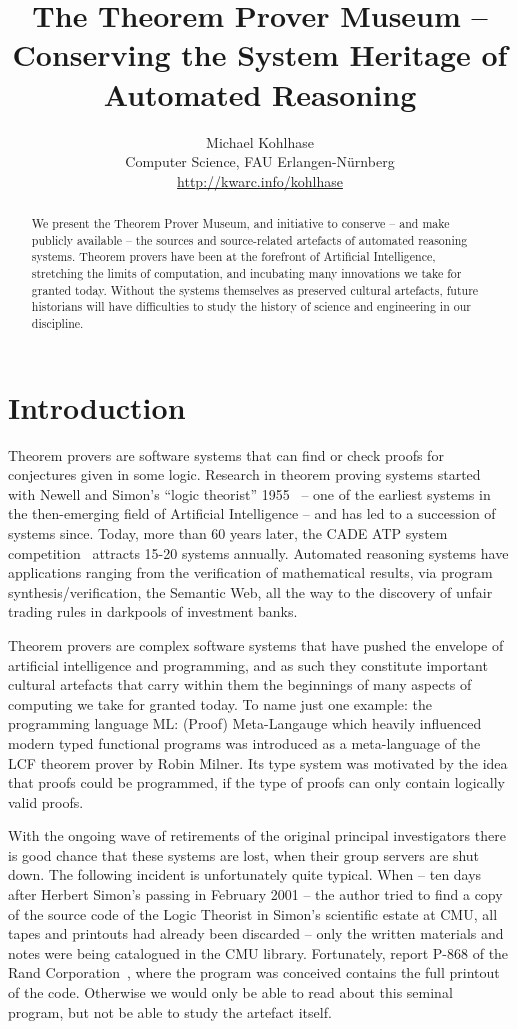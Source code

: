 \documentclass{article}
\title{The Theorem Prover Museum -- 
Conserving the System Heritage of Automated Reasoning}
\author{Michael Kohlhase\\
Computer Science, FAU Erlangen-N\"urnberg\\\url{http://kwarc.info/kohlhase}}
\begin{document}
\maketitle
\begin{abstract}
  We present the Theorem Prover Museum, and initiative to conserve -- and make publicly
  available -- the sources and source-related artefacts of automated reasoning systems.
  Theorem provers have been at the forefront of Artificial Intelligence, stretching the
  limits of computation, and incubating many innovations we take for granted
  today. Without the systems themselves as preserved cultural artefacts, future historians
  will have difficulties to study the history of science and engineering in our
  discipline.  %
\end{abstract}
\section{Introduction}\label{sec:intro}

Theorem provers are software systems that can find or check proofs for conjectures given
in some logic. Research in theorem proving systems started with Newell and Simon's ``logic
theorist'' 1955~\cite{NewSim:ltmcips56} -- one of the earliest systems in the
then-emerging field of Artificial Intelligence -- and has led to a succession of systems
since. Today, more than 60 years later, the CADE ATP system competition~\cite{CASC}
attracts 15-20 systems annually. Automated reasoning systems have applications ranging
from the verification of mathematical results, via program synthesis/verification, the
Semantic Web, all the way to the discovery of unfair trading rules in darkpools of
investment banks.

Theorem provers are complex software systems that have pushed the envelope of artificial
intelligence and programming, and as such they constitute important cultural artefacts
that carry within them the beginnings of many aspects of computing we take for granted
today. To name just one example: the programming language ML: (Proof) Meta-Langauge which
heavily influenced modern typed functional programs was introduced as a meta-language of
the LCF theorem prover by Robin Milner. Its type system was motivated by the idea that
proofs could be programmed, if the type of proofs can only contain logically valid
proofs.

With the ongoing wave of retirements of the original principal investigators there is good
chance that these systems are lost, when their group servers are shut down. The following
incident is unfortunately quite typical. When -- ten days after Herbert Simon's passing in
February 2001 -- the author tried to find a copy of the source code of the Logic Theorist
in Simon's scientific estate at CMU, all tapes and printouts had already been discarded --
only the written materials and notes were being catalogued in the CMU
library. Fortunately, report P-868 of the Rand Corporation~\cite{NewSim:ltmcips56}, where
the program was conceived contains the full printout of the code. Otherwise we would only
be able to read about this seminal program, but not be able to study the artefact
itself. 
\end{document}

